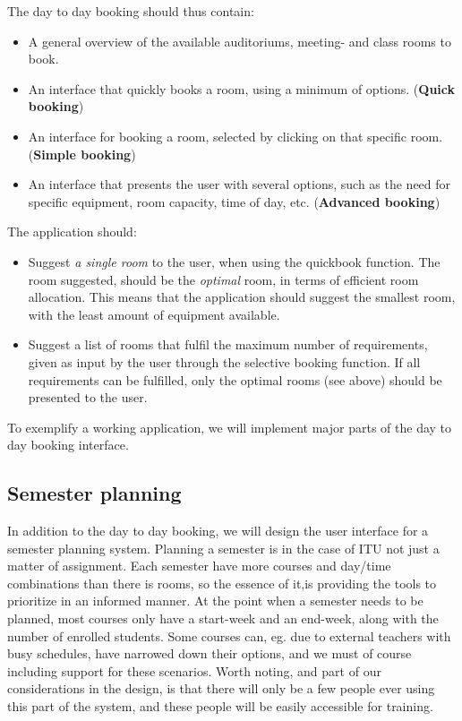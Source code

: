 The day to day booking should thus contain:

\begin{itemize}
	\item A general overview of the available auditoriums, meeting- and class rooms to book.
	\item An interface that quickly books a room, using a minimum of options. (\textbf{Quick booking})
	\item An interface for booking a room, selected by clicking on that specific room. (\textbf{Simple booking})
	\item An interface that presents the user with several options, such as the need for specific equipment, room capacity, time of day, etc. (\textbf{Advanced booking})
\end{itemize}

The application should:

\begin{itemize}
	\item Suggest \emph{a single room} to the user, when using the quickbook function. The room suggested, should be the \emph{optimal} room, in terms of efficient room allocation. This means that the application should suggest the smallest room, with the least amount of equipment available.
	\item Suggest a list of rooms that fulfil the maximum number of requirements, given as input by the user through the selective booking function. If all requirements can be fulfilled, only the optimal rooms (see above) should be presented to the user.
\end{itemize}

To exemplify a working application, we will implement major parts of the day to day booking interface.

\subsection{Semester planning}
\label{chap1:semester_planning}
In addition to the day to day booking, we will design the user interface for a semester planning system. Planning a semester is in the case of ITU not just a matter of assignment. Each semester have more courses and day/time combinations than there is rooms, so the essence of it,is providing the tools to prioritize in an informed manner. At the point when a semester needs to be planned, most courses only have a start-week and an end-week, along with the number of enrolled students. Some courses can, eg. due to external teachers with busy schedules, have narrowed down their options, and we must of course including support for these scenarios.
Worth noting, and part of our considerations in the design, is that there will only be a few people ever using this part of the system, and these people will be easily accessible for training.

